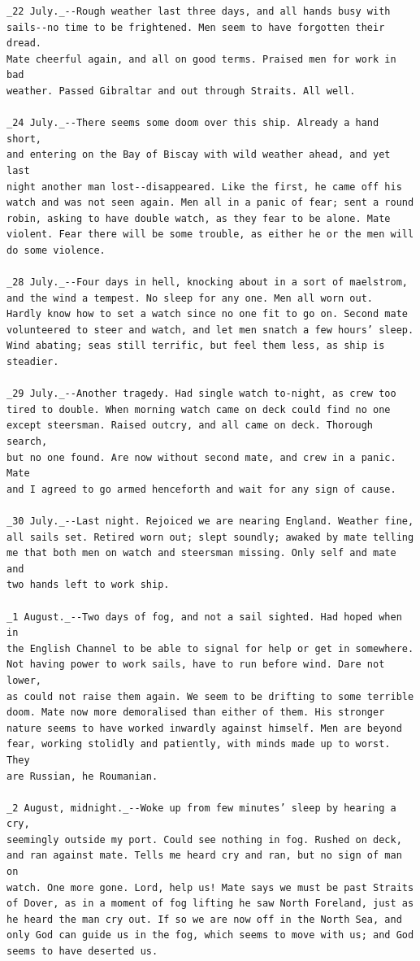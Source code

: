 \documentclass{article}
\begin{document}
\begin{verbatim}
_22 July._--Rough weather last three days, and all hands busy with
sails--no time to be frightened. Men seem to have forgotten their dread.
Mate cheerful again, and all on good terms. Praised men for work in bad
weather. Passed Gibraltar and out through Straits. All well.

_24 July._--There seems some doom over this ship. Already a hand short,
and entering on the Bay of Biscay with wild weather ahead, and yet last
night another man lost--disappeared. Like the first, he came off his
watch and was not seen again. Men all in a panic of fear; sent a round
robin, asking to have double watch, as they fear to be alone. Mate
violent. Fear there will be some trouble, as either he or the men will
do some violence.

_28 July._--Four days in hell, knocking about in a sort of maelstrom,
and the wind a tempest. No sleep for any one. Men all worn out.
Hardly know how to set a watch since no one fit to go on. Second mate
volunteered to steer and watch, and let men snatch a few hours’ sleep.
Wind abating; seas still terrific, but feel them less, as ship is
steadier.

_29 July._--Another tragedy. Had single watch to-night, as crew too
tired to double. When morning watch came on deck could find no one
except steersman. Raised outcry, and all came on deck. Thorough search,
but no one found. Are now without second mate, and crew in a panic. Mate
and I agreed to go armed henceforth and wait for any sign of cause.

_30 July._--Last night. Rejoiced we are nearing England. Weather fine,
all sails set. Retired worn out; slept soundly; awaked by mate telling
me that both men on watch and steersman missing. Only self and mate and
two hands left to work ship.

_1 August._--Two days of fog, and not a sail sighted. Had hoped when in
the English Channel to be able to signal for help or get in somewhere.
Not having power to work sails, have to run before wind. Dare not lower,
as could not raise them again. We seem to be drifting to some terrible
doom. Mate now more demoralised than either of them. His stronger
nature seems to have worked inwardly against himself. Men are beyond
fear, working stolidly and patiently, with minds made up to worst. They
are Russian, he Roumanian.

_2 August, midnight._--Woke up from few minutes’ sleep by hearing a cry,
seemingly outside my port. Could see nothing in fog. Rushed on deck,
and ran against mate. Tells me heard cry and ran, but no sign of man on
watch. One more gone. Lord, help us! Mate says we must be past Straits
of Dover, as in a moment of fog lifting he saw North Foreland, just as
he heard the man cry out. If so we are now off in the North Sea, and
only God can guide us in the fog, which seems to move with us; and God
seems to have deserted us.


\end{verbatim}
\end{document}
